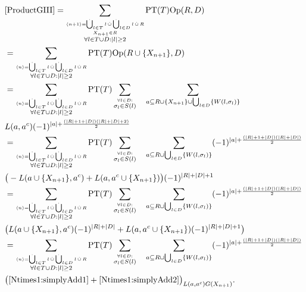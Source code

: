 \documentclass[b5paper,draft,openbib,12pt]{memoir}
\DeclareMathOperator{\dotCup}{\mathop{\dot{\bigcup}}}
\DeclareMathOperator{\dotcup}{\mathop{\dot{\cup}}}
\begin{document}
\begin{align}\notag
&\eqref{ProductGIII}
=\sum_{\stackrel{\langle n +1 \rangle = \dotCup_{l\in T} l \dotcup \dotCup_{l\in D} l \dotcup R}{\stackrel{X_{n+1}\in R}{ \forall l \in T \cup D: |l|\ge 2}}} \text{PT}(T) \text{Op}(R,D)\\\notag
&=\sum_{\stackrel{\langle n \rangle = \dotCup_{l\in T} l \dotcup \dotCup_{l\in D} l \dotcup R}{ \forall l \in T \cup D: |l|\ge 2}} \text{PT}(T)
\text{Op}(R\cup \{X_{n+1}\},D)\\\notag
&=\sum_{\stackrel{\langle n \rangle = \dotCup_{l\in T} l \dotcup \dotCup_{l\in D} l \dotcup R}{ \forall l \in T \cup D: |l|\ge 2}} \text{PT}(T)
\sum_{\stackrel{\forall l \in D:}{\sigma_l \in S(l)}} \quad \sum_{a\subseteq R \cup \{X_{n+1}\} \cup \bigcup_{l\in D} \{W(l,\sigma_l)\}}\\\notag
&L(a,a^c)(-1)^{|a| + \frac{(|R|+1+|D|)(|R|+|D|+2)}{2}}\\\notag
&=\sum_{\stackrel{\langle n \rangle = \dotCup_{l\in T} l \dotcup \dotCup_{l\in D} l \dotcup R}{ \forall l \in T \cup D: |l|\ge 2}} \text{PT}(T)
\sum_{\stackrel{\forall l \in D:}{\sigma_l \in S(l)}} \quad \sum_{a\subseteq R \cup \bigcup_{l\in D} \{W(l,\sigma_l)\}}
(-1)^{|a| + \frac{(|R|+1+|D|)(|R|+|D|)}{2}}\\\notag
&\big(-L(a\cup\{X_{n+1}\},a^c)+L(a,a^c\cup \{X_{n+1}\}) \big)(-1)^{|R|+|D|+1} \\\notag
&=\sum_{\stackrel{\langle n \rangle = \dotCup_{l\in T} l \dotcup \dotCup_{l\in D} l \dotcup R}{ \forall l \in T \cup D: |l|\ge 2}} \text{PT}(T)
\sum_{\stackrel{\forall l \in D:}{\sigma_l \in S(l)}} \quad \sum_{a\subseteq R \cup \bigcup_{l\in D} \{W(l,\sigma_l)\}}
(-1)^{|a| + \frac{(|R|+1+|D|)(|R|+|D|)}{2}}\\\notag
&\big(L(a\cup\{X_{n+1}\},a^c)(-1)^{|R|+|D|}+L(a,a^c\cup \{X_{n+1}\})(-1)^{|R|+|D|+1} \big) \\\notag
&=\sum_{\stackrel{\langle n \rangle = \dotCup_{l\in T} l \dotcup \dotCup_{l\in D} l \dotcup R}{ \forall l \in T \cup D: |l|\ge 2}} \text{PT}(T)
\sum_{\stackrel{\forall l \in D:}{\sigma_l \in S(l)}} \quad \sum_{a\subseteq R \cup \bigcup_{l\in D} \{W(l,\sigma_l)\}}
(-1)^{|a| + \frac{(|R|+1+|D|)(|R|+|D|)}{2}}\\\notag
&\big(\eqref{Ntimes1:simplyAdd1}+\eqref{Ntimes1:simplyAdd2} \big)_{L(a,a^c)G(X_{n+1})}.
\end{align}
\end{document}
